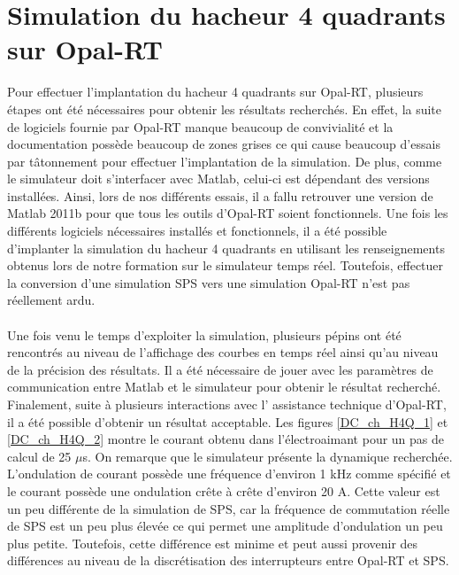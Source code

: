 \section{Simulation du hacheur 4 quadrants sur Opal-RT}
Pour effectuer l'implantation du hacheur 4 quadrants sur Opal-RT, plusieurs étapes ont été nécessaires pour obtenir les résultats recherchés. En effet, la suite de logiciels fournie par Opal-RT manque beaucoup de convivialité et la documentation possède beaucoup de zones grises ce qui cause beaucoup d'essais par tâtonnement pour effectuer l'implantation de la simulation. De plus, comme le simulateur doit s'interfacer avec Matlab, celui-ci est dépendant des versions installées. Ainsi, lors de nos différents essais, il a fallu retrouver une version de Matlab 2011b pour que tous les outils d'Opal-RT soient fonctionnels. Une fois les différents logiciels nécessaires installés et fonctionnels, il a été possible d'implanter la simulation du hacheur 4 quadrants en utilisant les renseignements obtenus lors de notre formation sur le simulateur temps réel. Toutefois, effectuer la conversion d'une simulation SPS vers une simulation Opal-RT n'est pas réellement ardu. 

\paragraph{} Une fois venu le temps d'exploiter la simulation, plusieurs pépins ont été rencontrés au niveau de l'affichage des courbes en temps réel ainsi qu'au niveau de la précision des résultats. Il a été nécessaire de jouer avec les paramètres de communication entre Matlab et le simulateur pour obtenir le résultat recherché. Finalement, suite à plusieurs interactions avec l’ assistance technique d'Opal-RT, il a été possible d'obtenir un résultat acceptable. Les figures \ref{DC_ch_H4Q_1} et \ref{DC_ch_H4Q_2} montre le courant obtenu dans l'électroaimant pour un pas de calcul de 25 $\mu$s. On remarque que le simulateur présente la dynamique recherchée. L'ondulation de courant possède une fréquence d'environ 1 kHz comme spécifié et le courant possède une ondulation crête à crête d'environ 20 A. Cette valeur est un peu différente de la simulation de SPS, car la fréquence de commutation réelle de SPS est un peu plus élevée ce qui permet une amplitude d'ondulation un peu plus petite. Toutefois, cette différence est minime et peut aussi provenir des différences au niveau de la discrétisation des interrupteurs entre Opal-RT et SPS.

